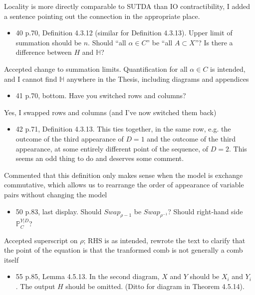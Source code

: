 \documentclass[12pt, a4paper]{article}
\begin{document}
Locality is more directly comparable to SUTDA than IO contractibility, I added a sentence pointing out the connection in the appropriate place.

\begin{itemize}
    \item  40 p.70, Definition 4.3.12 (similar for Definition 4.3.13). Upper limit of summation should be $n$. Should ``all $\alpha\in C$'' be ``all $A \subset X$''? Is there a difference between $H$ and $\mathbb{H}$?
\end{itemize}


Accepted change to summation limits. Quantification for all $\alpha \in C$ is intended, and I cannot find $\mathbb{H}$ anywhere in the Thesis, including diagrams and appendices

\begin{itemize}
    \item 41 p.70, bottom. Have you switched rows and columns?
\end{itemize}
 

Yes, I swapped rows and columns (and I've now switched them back)

\begin{itemize}
    \item 42 p.71, Definition 4.3.13. This ties together, in the same row, e.g. the outcome of the third appearance of $D = 1$ and the outcome of the third appearance, at some entirely different point of the sequence, of $D = 2$. This seems an odd thing to do and deserves some comment.
\end{itemize}

Commented that this definition only makes sense when the model is exchange commutative, which allows us to rearrange the order of appearance of variable pairs without changing the model


\begin{itemize}
    \item  50 p.83, last display. Should $Swap_{\rho - 1}$ be $Swap_{\rho^{-1}}$? Should right-hand side $\mathbb{P}^{Y|D}_C$?
\end{itemize}


Accepted superscript on $\rho$; RHS is as intended, rewrote the text to clarify that the point of the equation is that the tranformed comb is not generally a comb itself

\begin{itemize}
    \item 55 p.85, Lemma 4.5.13. In the second diagram, $X$ and $Y$ should be $X_i$ and $Y_i$ . The output $H$ should be omitted. (Ditto for diagram in Theorem 4.5.14).
\end{itemize}
 
\end{document}
